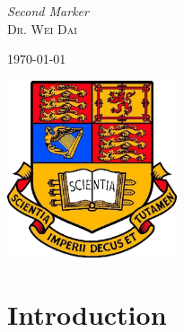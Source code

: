 \documentclass[10pt]{article}
\begin{document}
\begin{titlepage}
	\vfill
	
	{\large\textit{Second Marker}}\\
	\textsc{Dr. Wei Dai} 
	\vfill\vfill\vfill %
	
	{\large\today} %
	
	
	\vfill\vfill
	 
	\includegraphics[width=5cm]{imperialcollegelondon.jpg}\\[1cm] %
	
	\vfill %
	
\end{titlepage}


\section{Introduction}
\end{document}

